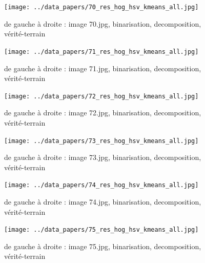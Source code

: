 \documentclass{book}
\begin{document}
\begin{figure}[H]
\begin{center}
\texttt{[image: ../data\_papers/70\_res\_hog\_hsv\_kmeans\_all.jpg]}
\end{center}
\caption{de gauche à droite : image 70.jpg, binarisation, decomposition, vérité-terrain}
\label{70}
\end{figure}
\clearpage


\begin{figure}[H]
\begin{center}
\texttt{[image: ../data\_papers/71\_res\_hog\_hsv\_kmeans\_all.jpg]}
\end{center}
\caption{de gauche à droite : image 71.jpg, binarisation, decomposition, vérité-terrain}
\label{71}
\end{figure}
\clearpage


\begin{figure}[H]
\begin{center}
\texttt{[image: ../data\_papers/72\_res\_hog\_hsv\_kmeans\_all.jpg]}
\end{center}
\caption{de gauche à droite : image 72.jpg, binarisation, decomposition, vérité-terrain}
\label{72}
\end{figure}
\clearpage


\begin{figure}[H]
\begin{center}
\texttt{[image: ../data\_papers/73\_res\_hog\_hsv\_kmeans\_all.jpg]}
\end{center}
\caption{de gauche à droite : image 73.jpg, binarisation, decomposition, vérité-terrain}
\label{73}
\end{figure}
\clearpage


\begin{figure}[H]
\begin{center}
\texttt{[image: ../data\_papers/74\_res\_hog\_hsv\_kmeans\_all.jpg]}
\end{center}
\caption{de gauche à droite : image 74.jpg, binarisation, decomposition, vérité-terrain}
\label{74}
\end{figure}
\clearpage


\begin{figure}[H]
\begin{center}
\texttt{[image: ../data\_papers/75\_res\_hog\_hsv\_kmeans\_all.jpg]}
\end{center}
\caption{de gauche à droite : image 75.jpg, binarisation, decomposition, vérité-terrain}
\label{75}
\end{figure}
\clearpage
\end{document}
